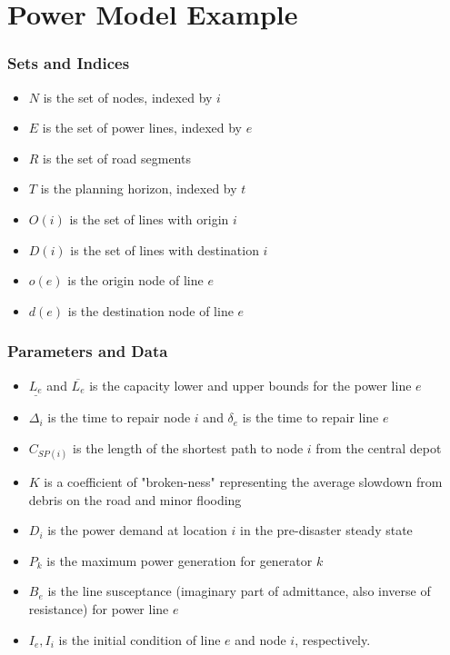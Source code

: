 \documentclass[t, pdftex]{beamer}
\begin{document}
\section{Power Model Example}
\begin{frame}
	\frametitle{Sets and Indices}
	\begin{itemize}
		\item $N$ is the set of nodes, indexed by $i$
		\item $E$ is the set of power lines, indexed by $e$
		\item $R$ is the set of road segments
		\item $T$ is the planning horizon, indexed by $t$
		\item $O(i)$ is the set of lines with origin $i$
		\item $D(i)$ is the set of lines with destination $i$
		\item $o(e)$ is the origin node of line $e$
		\item $d(e)$ is the destination node of line $e$
	\end{itemize}

\end{frame}
\begin{frame}
\frametitle{Parameters and Data}
\begin{itemize}
	\item $\underline{L_e}$ and $\overline{L_e}$ is the capacity lower and upper bounds for the power line $e$
	\item $\Delta_{i}$ is the time to repair node $i$ and $\delta_{e}$ is the time to repair line $e$
	\item $C_{SP(i)}$ is the length of the shortest path to node $i$ from the central depot
	\item $K$ is a coefficient of "broken-ness" representing the average slowdown from debris on the road and minor flooding
	\item $D_i$ is the power demand at location $i$ in the pre-disaster steady state
	\item $P_k$ is the maximum power generation for generator $k$
	\item $B_e$ is the line susceptance (imaginary part of admittance, also inverse of resistance) for power line $e$
	\item $I_e, I_i$ is the initial condition of line $e$ and node $i$, respectively.
\end{itemize}
\end{frame}
\end{document}
